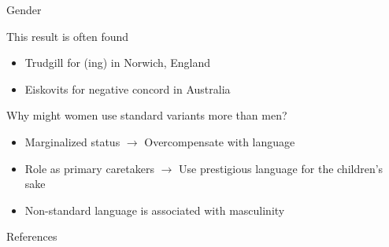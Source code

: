 \documentclass{beamer}
\newcommand{\subonefour}{Gender}
\begin{document}
      \begin{frame}{\subonefour}
        \begin{block}{This result is often found}
          \begin{itemize}
            \item Trudgill for (ing) in Norwich, England %
            \item Eiskovits for negative concord in Australia %
          \end{itemize}
        \end{block}
        \begin{block}{Why might women use standard variants more than men?}
          \begin{itemize}
            \item<2-> Marginalized status $\rightarrow$ Overcompensate with language
            \item<2-> Role as primary caretakers $\rightarrow$ Use prestigious language for the children's sake
            \item<2-> Non-standard language is associated with masculinity
          \end{itemize}
        \end{block}
      \end{frame}

      \begin{frame}{References}
      \end{frame}
\end{document}
